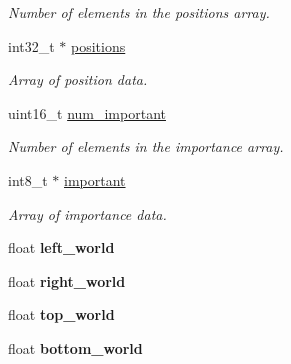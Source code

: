 \begin{DoxyCompactItemize}
\begin{DoxyCompactList}\small\item\em Number of elements in the positions array. \end{DoxyCompactList}\item 
\hypertarget{structworld_a77c78ba04f2c9d9ec440303b4c5c9315}{}int32\+\_\+t $\ast$ \hyperlink{structworld_a77c78ba04f2c9d9ec440303b4c5c9315}{positions}\label{structworld_a77c78ba04f2c9d9ec440303b4c5c9315}

\begin{DoxyCompactList}\small\item\em Array of position data. \end{DoxyCompactList}\item 
\hypertarget{structworld_abed08d529398af7384a71a3987e2d38b}{}uint16\+\_\+t \hyperlink{structworld_abed08d529398af7384a71a3987e2d38b}{num\+\_\+important}\label{structworld_abed08d529398af7384a71a3987e2d38b}

\begin{DoxyCompactList}\small\item\em Number of elements in the importance array. \end{DoxyCompactList}\item 
\hypertarget{structworld_ac9297068b2797d59cc07a34c6c9e9410}{}int8\+\_\+t $\ast$ \hyperlink{structworld_ac9297068b2797d59cc07a34c6c9e9410}{important}\label{structworld_ac9297068b2797d59cc07a34c6c9e9410}

\begin{DoxyCompactList}\small\item\em Array of importance data. \end{DoxyCompactList}\item 
\hypertarget{structworld_a99f3663ecf56964db064e633152a5933}{}float {\bfseries left\+\_\+world}\label{structworld_a99f3663ecf56964db064e633152a5933}

\item 
\hypertarget{structworld_a495beb3eaac6d7c609e3b38cd8ff3b3f}{}float {\bfseries right\+\_\+world}\label{structworld_a495beb3eaac6d7c609e3b38cd8ff3b3f}

\item 
\hypertarget{structworld_a1eb18e72c7d7c91f3ee5bb894ae03a84}{}float {\bfseries top\+\_\+world}\label{structworld_a1eb18e72c7d7c91f3ee5bb894ae03a84}

\item 
\hypertarget{structworld_aedbdcac999f964e7c7b8ffb658ecef67}{}float {\bfseries bottom\+\_\+world}\label{structworld_aedbdcac999f964e7c7b8ffb658ecef67}


\end{DoxyCompactItemize}
